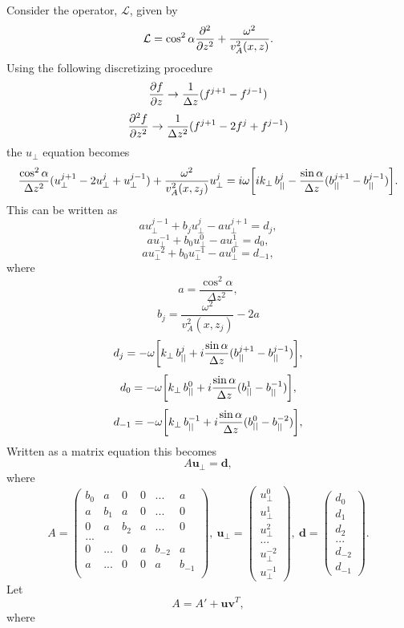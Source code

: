 \documentclass{article}
\let\vec\boldsymbol
\begin{document}
Consider the operator, $\mathcal{L}$, given by
\[\mathcal{L} = \cos^2\alpha\pdv[2]{}{z}+\frac{\omega^2}{v_A^2(x,z)}.\]
Using the following discretizing procedure
\[\pdv{f}{z}\rightarrow\frac{1}{\Delta z}(f^{j+1} - f^{j-1})\]
\[\pdv[2]{f}{z}\rightarrow\frac{1}{\Delta z^2}(f^{j+1} - 2 f^{j} + f^{j-1})\]
the $u_\perp$ equation becomes
\[\frac{\cos^2\alpha}{\Delta z^2}(u_\perp^{j+1} - 2u_\perp^j +u_\perp^{j-1}) + \frac{\omega^2}{v_A^2(x,z_j)}u_\perp^j=i\omega\qty[ik_\perp\, b_{||}^j - \frac{\sin\alpha}{\Delta z}(b_{||}^{j+1} - b_{||}^{j-1})].\]
This can be written as
\[a u_\perp^{j-1} + b_j u_\perp^j - au_\perp^{j+1} = d_j,\]
\[a u_\perp^{-1} + b_0 u_\perp^0 - au_\perp^{1} = d_0,\]
\[a u_\perp^{-2} + b_0 u_\perp^{-1} - au_\perp^{0} = d_{-1},\]
where
\[a = \frac{\cos^2\alpha}{\Delta z^2},\]
\[b_j = \frac{\omega^2}{v_A^2(x,z_j)} - 2a\]
\[d_j = -\omega\qty[k_\perp\,b_{||}^j+i\frac{\sin\alpha}{\Delta z}(b_{||}^{j+1} - b_{||}^{j-1})],\]
\[d_0 = -\omega\qty[k_\perp\,b_{||}^0+i\frac{\sin\alpha}{\Delta z}(b_{||}^{1} - b_{||}^{-1})],\]
\[d_{-1} = -\omega\qty[k_\perp\,b_{||}^{-1}+i\frac{\sin\alpha}{\Delta z}(b_{||}^{0} - b_{||}^{-2})],\]
Written as a matrix equation this becomes
\[A\vec{u}_\perp = \vec{d},\]
where
\[A = \begin{pmatrix}
b_0 & a   & 0 & 0 & ... & a \\
a   & b_1 & a & 0 & ... & 0 \\
0   & a & b_2 & a & ... & 0 \\
... \\
0 & ... & 0 & a & b_{-2} & a      \\ 
a & ... & 0 & 0 & a      & b_{-1} \\ 
\end{pmatrix},\ \vec{u}_\perp = \begin{pmatrix}
u_\perp^0 \\
u_\perp^1 \\
u_\perp^2 \\
... \\
u_\perp^{-2} \\
u_\perp^{-1}
\end{pmatrix},\ \vec{d} = \begin{pmatrix}
d_0 \\
d_1 \\
d_2 \\
... \\
d_{-2} \\
d_{-1}
\end{pmatrix}.\]
Let 
\[A = A' + \vec{u}\vec{v}^T,\]
where
\end{document}
